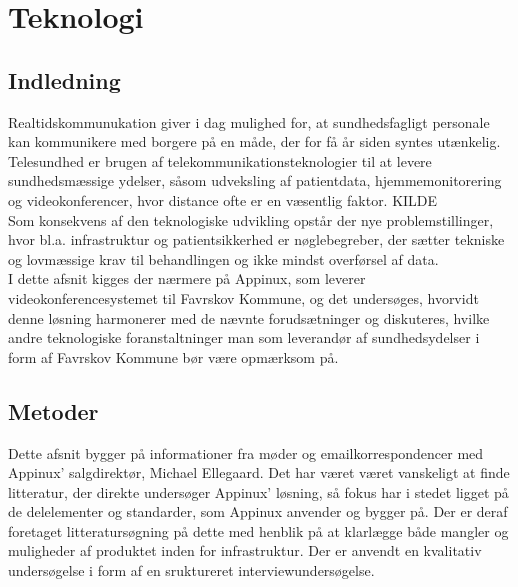 \chapter{Teknologi}
\section{Indledning}

Realtidskommunukation giver i dag mulighed for, at sundhedsfagligt personale kan kommunikere med borgere på en måde, der for få år siden syntes utænkelig.
\\Telesundhed er brugen af telekommunikationsteknologier til at levere sundhedsmæssige ydelser, såsom udveksling af patientdata, hjemmemonitorering og videokonferencer, hvor distance ofte er en væsentlig faktor. KILDE\\
Som konsekvens af den teknologiske udvikling opstår der nye problemstillinger, hvor bl.a. infrastruktur og patientsikkerhed er nøglebegreber, der sætter tekniske og lovmæssige krav til behandlingen og ikke mindst overførsel af data.
\\
I dette afsnit kigges der nærmere på Appinux, som leverer videokonferencesystemet til Favrskov Kommune, og det undersøges, hvorvidt denne løsning harmonerer med de nævnte forudsætninger og diskuteres, hvilke andre teknologiske foranstaltninger man som leverandør af sundhedsydelser i form af Favrskov Kommune bør være opmærksom på.

\section{Metoder}
Dette afsnit bygger på informationer fra møder og emailkorrespondencer med Appinux' salgdirektør, Michael Ellegaard. Det har været været vanskeligt at finde litteratur, der direkte undersøger Appinux' løsning, så fokus har i stedet ligget på de delelementer og standarder, som Appinux anvender og bygger på. Der er deraf foretaget litteratursøgning på dette med henblik på at klarlægge både mangler og muligheder af produktet inden for infrastruktur. Der er anvendt en kvalitativ undersøgelse i form af en sruktureret interviewundersøgelse.

